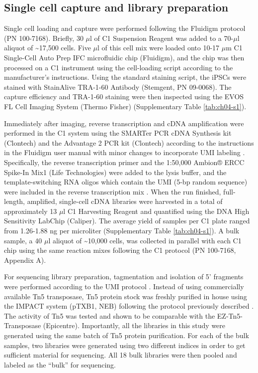 \subsection{Single cell capture and library
preparation}\label{single-cell-capture-and-library-preparation}

Single cell loading and capture were performed following the Fluidigm
protocol (PN 100-7168). Briefly, 30 $\mu$l of C1 Suspension Reagent was
added to a 70-$\mu$l aliquot of \textasciitilde{}17,500 cells. Five
$\mu$l of this cell mix were loaded onto 10-17 $\mu$m C1 Single-Cell
Auto Prep IFC microfluidic chip (Fluidigm), and the chip was then
processed on a C1 instrument using the cell-loading script according to
the manufacturer's instructions. Using the standard staining script, the
iPSCs were stained with StainAlive TRA-1-60 Antibody (Stemgent, PN
09-0068). The capture efficiency and TRA-1-60 staining were then
inspected using the EVOS FL Cell Imaging System (Thermo Fisher)
(Supplementary Table \ref{tab:ch04-s1}).

Immediately after imaging, reverse transcription and cDNA amplification
were performed in the C1 system using the SMARTer PCR cDNA Synthesis kit
(Clontech) and the Advantage 2 PCR kit (Clontech) according to the
instructions in the Fluidigm user manual with minor changes to
incorporate UMI labeling \citep{Islam2014}. Specifically, the reverse
transcription primer and the 1:50,000 Ambion® ERCC Spike-In Mix1 (Life
Technologies) were added to the lysis buffer, and the template-switching
RNA oligos which contain the UMI (5-bp random sequence) were included in
the reverse transcription mix \citep{Islam2011, Islam2012, Islam2014}.
When the run finished, full-length, amplified, single-cell cDNA
libraries were harvested in a total of approximately 13 $\mu$l C1
Harvesting Reagent and quantified using the DNA High Sensitivity LabChip
(Caliper). The average yield of samples per C1 plate ranged from
1.26-1.88 ng per microliter (Supplementary Table \ref{tab:ch04-s1}). A bulk sample, a
40 $\mu$l aliquot of \textasciitilde{}10,000 cells, was collected in
parallel with each C1 chip using the same reaction mixes following the
C1 protocol (PN 100-7168, Appendix A).

For sequencing library preparation, tagmentation and isolation of 5'
fragments were performed according to the UMI protocol \citep{Islam2014}.
Instead of using commercially available Tn5 transposase, Tn5 protein
stock was freshly purified in house using the IMPACT system (pTXB1, NEB)
following the protocol previously described \citep{Picelli2014}. The
activity of Tn5 was tested and shown to be comparable with the
EZ-Tn5-Transposase (Epicentre). Importantly, all the libraries in this
study were generated using the same batch of Tn5 protein purification.
For each of the bulk samples, two libraries were generated using two
different indices in order to get sufficient material for sequencing.
All 18 bulk libraries were then pooled and labeled as the ``bulk'' for
sequencing.

